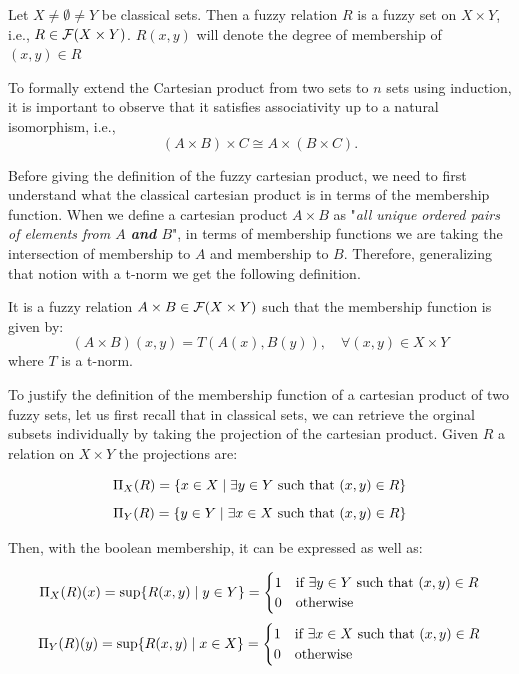 \begin{definition}
  Let $X\neq \emptyset \neq Y$ be classical sets. Then a fuzzy relation $R$ is a fuzzy set on $X\times Y$, i.e., $R\in \mathcal{F}(X\times Y)$. $R(x,y)$ will denote the degree of membership of $(x,y) \in R$
\end{definition}

\begin{remark}
  To formally extend the Cartesian product from two sets to \( n \) sets using induction, it is important to observe that it satisfies associativity up to a natural isomorphism, i.e., 
  \[
  (A\times B)\times C \cong A\times (B\times C).
  \]
\end{remark}

Before giving the definition of the fuzzy cartesian product, we need to first understand what the classical cartesian product is in terms of the membership function. When we define a cartesian product $A\times B$ as "\textit{all unique ordered pairs of elements from $A$ \textbf{and} $B$}", in terms of membership functions we are taking the intersection of membership to $A$ and membership to $B$. Therefore, generalizing that notion with a t-norm we get the following definition.

\begin{definition}
  It is a fuzzy relation $A\times B \in \mathcal{F}(X\times Y)$ such that the membership function is given by:
  \[ 
  (A\times B)(x,y) = T(A(x), B(y)), \quad \forall (x,y) \in X\times Y
  \]
  where $T$ is a t-norm.
\end{definition}

To justify the definition of the membership function of a cartesian product of two fuzzy sets, let us first recall that in classical sets, we can retrieve the orginal subsets individually by taking the projection of the cartesian product. Given $R$ a relation on $X\times Y$ the projections are:

\[\Pi_X(R)=\{x \in X \mid \exists y \in Y \textnormal{ such that } (x,y) \in R\}\]
\[\Pi_Y(R)=\{y \in Y \mid \exists x \in X \textnormal{ such that } (x,y) \in R\}\]

Then, with the boolean membership, it can be expressed as well as:

\[\Pi_X(R)(x)=\sup\{R(x,y) \mid y\in Y\}=
\begin{cases}
  1 & \textnormal{if } \exists y \in Y \textnormal{ such that } (x,y) \in R \\
  0 & \textnormal{otherwise}
\end{cases}
\]
\[
  \Pi_Y(R)(y)=\sup\{R(x,y) \mid x\in X\}=
  \begin{cases}
    1 & \textnormal{if } \exists x \in X \textnormal{ such that } (x,y) \in R \\
    0 & \textnormal{otherwise}
  \end{cases}
\]

